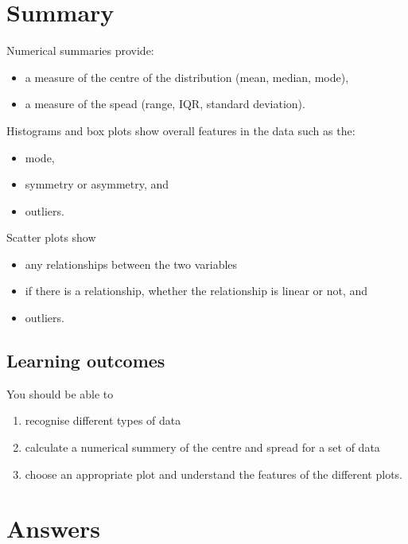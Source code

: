 \documentclass[
  oneside]{krantz}
\begin{document}
\hypertarget{SUMdata}{%
\section{Summary}\label{SUMdata}}

Numerical summaries provide:

\begin{itemize}
\item
  a measure of the centre of the distribution (mean, median, mode),
\item
  a measure of the spead (range, IQR, standard deviation).
\end{itemize}

Histograms and box plots show overall features in the data such as the:

\begin{itemize}
\item
  mode,
\item
  symmetry or asymmetry, and
\item
  outliers.
\end{itemize}

Scatter plots show

\begin{itemize}
\item
  any relationships between the two variables
\item
  if there is a relationship, whether the relationship is linear or not, and
\item
  outliers.
\end{itemize}

\hypertarget{learning-outcomes}{%
\subsection{Learning outcomes}\label{learning-outcomes}}

You should be able to

\begin{enumerate}
\def\labelenumi{\arabic{enumi}.}
\item
  recognise different types of data
\item
  calculate a numerical summery of the centre and spread for a set of data
\item
  choose an appropriate plot and understand the features of the different plots.
\end{enumerate}

\hypertarget{ANSdata}{%
\section{Answers}\label{ANSdata}}
\end{document}
